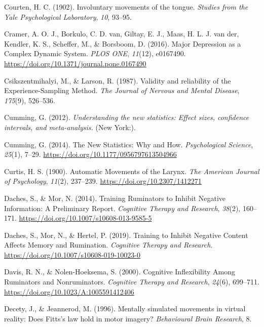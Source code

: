 \documentclass[a4paper,12pt,twoside,openright,oldfontcommands]{memoir}
\begin{document}
\leavevmode\hypertarget{ref-courten_involuntary_1902}{}%
Courten, H. C. (1902). Involuntary movements of the tongue. \emph{Studies from the Yale Psychological Laboratory}, \emph{10}, 93--95.

\leavevmode\hypertarget{ref-cramer_major_2016}{}%
Cramer, A. O. J., Borkulo, C. D. van, Giltay, E. J., Maas, H. L. J. van der, Kendler, K. S., Scheffer, M., \& Borsboom, D. (2016). Major Depression as a Complex Dynamic System. \emph{PLOS ONE}, \emph{11}(12), e0167490. \url{https://doi.org/10.1371/journal.pone.0167490}

\leavevmode\hypertarget{ref-csikszentmihalyi_validity_1987}{}%
Csikszentmihalyi, M., \& Larson, R. (1987). Validity and reliability of the Experience-Sampling Method. \emph{The Journal of Nervous and Mental Disease}, \emph{175}(9), 526--536.

\leavevmode\hypertarget{ref-Cumming2012}{}%
Cumming, G. (2012). \emph{Understanding the new statistics: Effect sizes, confidence intervals, and meta-analysis.} (New York:).

\leavevmode\hypertarget{ref-cumming_new_2014}{}%
Cumming, G. (2014). The New Statistics: Why and How. \emph{Psychological Science}, \emph{25}(1), 7--29. \url{https://doi.org/10.1177/0956797613504966}

\leavevmode\hypertarget{ref-curtis_automatic_1900}{}%
Curtis, H. S. (1900). Automatic Movements of the Larynx. \emph{The American Journal of Psychology}, \emph{11}(2), 237--239. \url{https://doi.org/10.2307/1412271}

\leavevmode\hypertarget{ref-daches_training_2014}{}%
Daches, S., \& Mor, N. (2014). Training Ruminators to Inhibit Negative Information: A Preliminary Report. \emph{Cognitive Therapy and Research}, \emph{38}(2), 160--171. \url{https://doi.org/10.1007/s10608-013-9585-5}

\leavevmode\hypertarget{ref-daches_training_2019}{}%
Daches, S., Mor, N., \& Hertel, P. (2019). Training to Inhibit Negative Content Affects Memory and Rumination. \emph{Cognitive Therapy and Research}. \url{https://doi.org/10.1007/s10608-019-10023-0}

\leavevmode\hypertarget{ref-Davis2000}{}%
Davis, R. N., \& Nolen-Hoeksema, S. (2000). Cognitive Inflexibility Among Ruminators and Nonruminators. \emph{Cognitive Therapy and Research}, \emph{24}(6), 699--711. \url{https://doi.org/10.1023/A:1005591412406}

\leavevmode\hypertarget{ref-decety_mentally_1996}{}%
Decety, J., \& Jeannerod, M. (1996). Mentally simulated movements in virtual reality: Does Fitts's law hold in motor imagery? \emph{Behavioural Brain Research}, 8.
\end{document}
